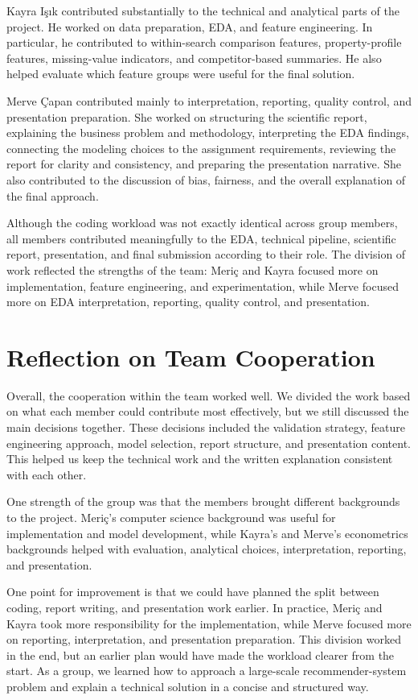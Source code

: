\documentclass[runningheads]{llncs}
\begin{document}
Kayra I\c{s}\i{}k contributed substantially to the technical and analytical parts of the project. He worked on data preparation, EDA, and feature engineering. In particular, he contributed to within-search comparison features, property-profile features, missing-value indicators, and competitor-based summaries. He also helped evaluate which feature groups were useful for the final solution.

Merve \c{C}apan contributed mainly to interpretation, reporting, quality control, and presentation preparation. She worked on structuring the scientific report, explaining the business problem and methodology, interpreting the EDA findings, connecting the modeling choices to the assignment requirements, reviewing the report for clarity and consistency, and preparing the presentation narrative. She also contributed to the discussion of bias, fairness, and the overall explanation of the final approach.

Although the coding workload was not exactly identical across group members, all members contributed meaningfully to the EDA, technical pipeline, scientific report, presentation, and final submission according to their role. The division of work reflected the strengths of the team: Meri\c{c} and Kayra focused more on implementation, feature engineering, and experimentation, while Merve focused more on EDA interpretation, reporting, quality control, and presentation.

\section{Reflection on Team Cooperation}

Overall, the cooperation within the team worked well. We divided the work based on what each member could contribute most effectively, but we still discussed the main decisions together. These decisions included the validation strategy, feature engineering approach, model selection, report structure, and presentation content. This helped us keep the technical work and the written explanation consistent with each other.

One strength of the group was that the members brought different backgrounds to the project. Meri\c{c}'s computer science background was useful for implementation and model development, while Kayra's and Merve's econometrics backgrounds helped with evaluation, analytical choices, interpretation, reporting, and presentation.

One point for improvement is that we could have planned the split between coding, report writing, and presentation work earlier. In practice, Meri\c{c} and Kayra took more responsibility for the implementation, while Merve focused more on reporting, interpretation, and presentation preparation. This division worked in the end, but an earlier plan would have made the workload clearer from the start. As a group, we learned how to approach a large-scale recommender-system problem and explain a technical solution in a concise and structured way.
\end{document}
